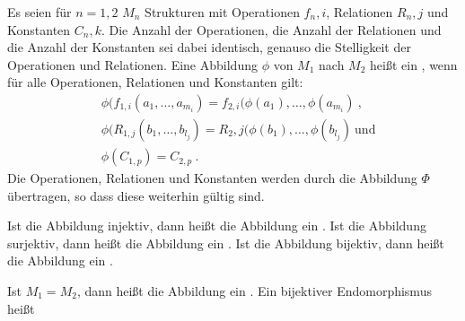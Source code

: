 \begin{unitAnmerkung}[Homomorphismen]
Es seien für $n = 1,2$ $M_n$ Strukturen  mit Operationen $f_n,i$, Relationen 
$R_n,j$ und Konstanten $C_n,k$. Die Anzahl der Operationen, die Anzahl der
Relationen und die Anzahl der Konstanten sei dabei identisch, genauso die 
Stelligkeit der Operationen und Relationen. Eine Abbildung $\phi$ von $M_1$ 
nach $M_2$ heißt ein , wenn für alle Operationen, 
Relationen und Konstanten gilt:
\begin{align}
  &\phi(f_{1,i}(a_1, \ldots, a_{m_i}) 
  = f_{2,i}(\phi(a_1), \ldots , \phi(a_{m_i}) \ ,\\
  &\phi(R_{1,j}(b_1, \ldots, b_{l_j}) 
  = R_2,j(\phi(b_1), \ldots , \phi(b_{l_j}) \ \text{und}\\
  &\phi(C_{1,p}) = C_{2,p}\ .
\end{align}
Die Operationen, Relationen und Konstanten werden durch die Abbildung $\Phi$
übertragen, so dass diese weiterhin gültig sind.

Ist die Abbildung injektiv, dann heißt die Abbildung ein 
.
Ist die Abbildung surjektiv, dann heißt die Abbildung ein 
.
Ist die Abbildung bijektiv, dann heißt die Abbildung ein 
.

Ist $M_1 = M_2$, dann heißt die Abbildung ein .
Ein bijektiver Endomorphismus heißt 
\end{unitAnmerkung}
